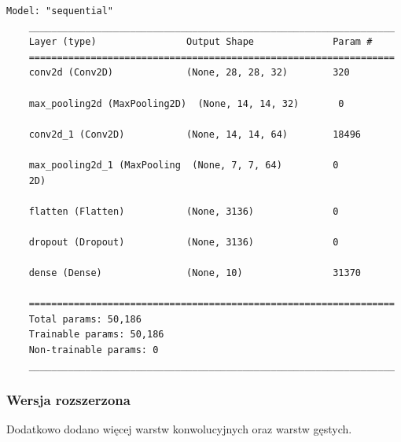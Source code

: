 \documentclass{article}
\begin{document}
\begin{lstlisting}[style=siec]
    Model: "sequential"
    _________________________________________________________________
    Layer (type)                Output Shape              Param #   
    =================================================================
    conv2d (Conv2D)             (None, 28, 28, 32)        320       
                                                                    
    max_pooling2d (MaxPooling2D)  (None, 14, 14, 32)       0                                                                      
                                                                    
    conv2d_1 (Conv2D)           (None, 14, 14, 64)        18496     
                                                                    
    max_pooling2d_1 (MaxPooling  (None, 7, 7, 64)         0         
    2D)                                                             
                                                                    
    flatten (Flatten)           (None, 3136)              0         
                                                                    
    dropout (Dropout)           (None, 3136)              0         
                                                                    
    dense (Dense)               (None, 10)                31370     
                                                                    
    =================================================================
    Total params: 50,186
    Trainable params: 50,186
    Non-trainable params: 0
    _________________________________________________________________
\end{lstlisting}

\subsubsection{Wersja rozszerzona}

Dodatkowo dodano więcej warstw konwolucyjnych oraz warstw gęstych.
\end{document}
